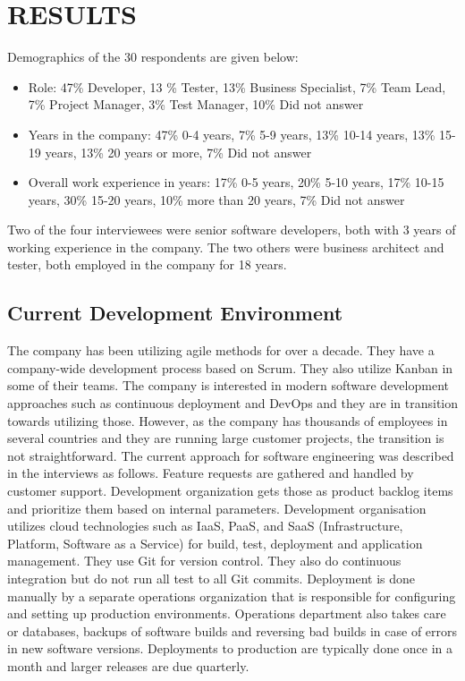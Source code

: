 \section{RESULTS}
Demographics of the 30 respondents are given below:

\begin{itemize}
	\item Role: 47\% Developer, 13 \% Tester, 13\% Business Specialist, 7\% Team Lead, 7\% Project Manager, 3\% Test Manager, 10\% Did not answer
    \item Years in the company: 47\% 0-4 years, 7\% 5-9 years, 13\% 10-14 years, 13\% 15-19 years, 13\% 20 years or more, 7\% Did not answer
    \item Overall work experience in years: 17\% 0-5 years, 20\% 5-10 years, 17\% 10-15 years, 30\% 15-20 years, 10\% more than 20 years, 7\% Did not answer
\end{itemize}

Two of the four interviewees were senior software developers, both with 3 years of working experience in the company. The two others were business architect and tester, both employed in the company for 18 years.

 

 \subsection{Current Development Environment}
The company has been utilizing agile methods for over a decade. They have a company-wide development process based on Scrum. They also utilize Kanban in some of their teams. The company is interested in modern software development approaches such as continuous deployment and DevOps and they are in transition towards utilizing those. However, as the company has thousands of employees in several countries and they are running large customer projects, the transition is not straightforward.
The current approach for software engineering was described in the interviews as follows. Feature requests are gathered and handled by customer support. Development organization gets those as product backlog items and prioritize them based on internal parameters. Development organisation utilizes cloud technologies such as IaaS, PaaS, and SaaS (Infrastructure, Platform, Software as a Service) for build, test, deployment and application management. They use Git for version control. They also do continuous integration but do not run all test to all Git commits. Deployment is done manually by a separate operations organization that is responsible for configuring and setting up production environments. Operations department also takes care or databases, backups of software builds and reversing bad builds in case of errors in new software versions. Deployments to production are typically done once in a month and larger releases are due quarterly.  

